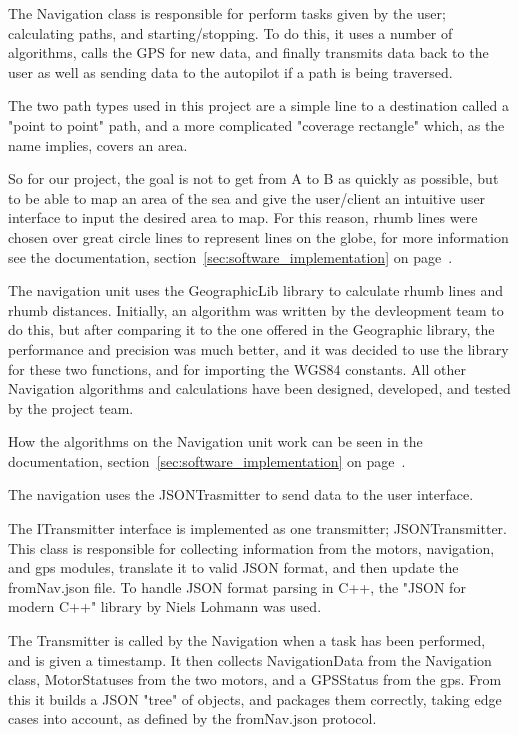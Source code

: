 The Navigation class is responsible for perform tasks given by the user; calculating paths, and starting/stopping. To do this, it uses a number of algorithms, calls the GPS for new data, and finally transmits data back to the user as well as sending data to the autopilot if a path is being traversed.

The two path types used in this project are a simple line to a destination called a "point to point" path, and a more complicated "coverage rectangle" which, as the name implies, covers an area.

So for our project, the goal is not to get from A to B as quickly as possible, but to be able to map an area of the sea and give the user/client an intuitive user interface to input the desired area to map. For this reason, rhumb lines were chosen over great circle lines to represent lines on the globe, for more information see the documentation, section~\ref{sec:software_implementation} on page~\pageref{sec:software_implementation}.

The navigation unit uses the GeographicLib library to calculate rhumb lines and rhumb distances. Initially, an algorithm was written by the devleopment team to do this, but after comparing it to the one offered in the Geographic library, the performance and precision was much better, and it was decided to use the library for these two functions, and for importing the WGS84 constants. All other Navigation algorithms and calculations have been designed, developed, and tested by the project team.

How the algorithms on the Navigation unit work can be seen in the documentation, section~\ref{sec:software_implementation} on page~\pageref{sec:software_implementation}.

The navigation uses the JSONTrasmitter to send data to the user interface.

The ITransmitter interface is implemented as one transmitter; JSONTransmitter. This class is responsible for collecting information from the motors, navigation, and gps modules, translate it to valid JSON format, and then update the fromNav.json file. To handle JSON format parsing in C++, the "JSON for modern C++" library by Niels Lohmann was used\cite{json}. 

The Transmitter is called by the Navigation when a task has been performed, and is given a timestamp. It then collects NavigationData from the Navigation class, MotorStatuses from the two motors, and a GPSStatus from the gps. From this it builds a JSON "tree" of objects, and packages them correctly, taking edge cases into account, as defined by the fromNav.json protocol. 

